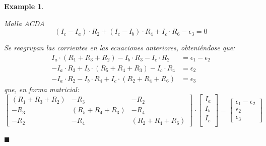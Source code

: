 \documentclass[11pt]{book} %
\numberwithin{dummy}{section}
\theoremstyle{ocrenumbox}
\theoremstyle{blacknumex}
\newtheorem{exampleT}{Example}[chapter]
\theoremstyle{blacknumbox}
\theoremstyle{ocrenum}
\newenvironment{example}{\begin{exampleT}}{\hfill{\tiny\ensuremath{\blacksquare}}\end{exampleT}}
\begin{document}
\begin{example}
\begin{enumerate}
			Malla ACDA
			\begin{equation*}
				(I_c - I_a) \cdot R_2 + (I_c - I_b) \cdot R_4 + I_c \cdot R_6 - \epsilon_3 = 0
			\end{equation*}
			
			Se reagrupan las corrientes en las ecuaciones anteriores, obteniéndose que: 
			\begin{align*}
				I_a \cdot (R_1 + R_3 + R_2)  - I_b\cdot R_3 - I_c \cdot R_2 &= \epsilon_1 - \epsilon_2\\
				- I_a \cdot R_3 + I_b \cdot (R_5 + R_4 + R_3) - I_c \cdot R_4 &=  \epsilon_2\\
				- I_a \cdot R_2 - I_b \cdot R_4 + I_c \cdot (R_2 + R_4 + R_6) &= \epsilon_3
			\end{align*}
			que, en forma matricial: 
			\begin{equation*}
				\begin{bmatrix}
					(R_1 + R_3 + R_2) &  - R_3 & - R_2 \\
					- R_3 & (R_5 + R_4 + R_3) & - R_4 \\
					- R_2 & - R_4 &  (R_2 + R_4 + R_6)
				\end{bmatrix} \cdot %
				\begin{bmatrix}
					I_a\\
					I_b\\
					I_c\\
				\end{bmatrix} = %
				\begin{bmatrix}
					\epsilon_1 - \epsilon_2\\
					\epsilon_2\\
					\epsilon_3
				\end{bmatrix}
			\end{equation*}
		\end{enumerate}
	\end{example}
	
\end{document}
